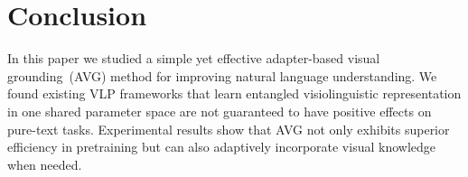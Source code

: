 \section{Conclusion}
In this paper we studied a simple yet effective adapter-based visual grounding~(AVG) method for improving natural language understanding. We found existing VLP frameworks that learn entangled visiolinguistic representation in one shared parameter space are not guaranteed to have positive effects on pure-text tasks. Experimental results show that AVG not only exhibits superior efficiency in pretraining but can also adaptively incorporate visual knowledge when needed.
